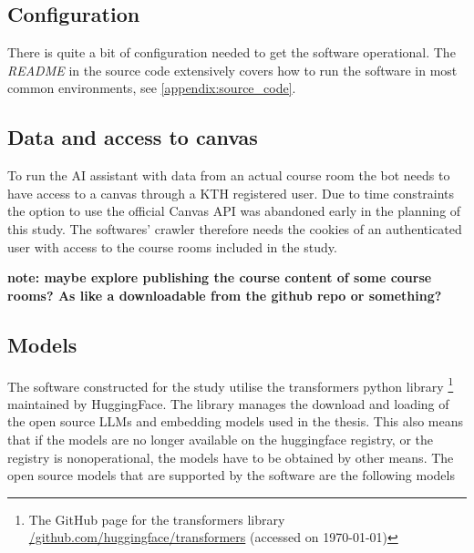 \subsection{Configuration}


There is quite a bit of configuration needed to get the software operational. The \textit{README} in the source code extensively covers how to run the software in most common environments, see \autoref{appendix:source_code}.


\subsection[Data/Access to Canvas]{Data and access to canvas}


To run the AI assistant with data from an actual course room the bot needs to have access to a canvas through a KTH registered user. Due to time constraints the option to use the official Canvas API was abandoned early in the planning of this study. The softwares’ crawler therefore needs the cookies of an authenticated user with access to the course rooms included in the study.


\textbf{note: maybe explore publishing the course content of some course rooms? As like a downloadable from the github repo or something?}


\subsection{Models}


The software constructed for the study utilise the transformers python library \footnote{The GitHub page for the transformers library \href{https://github.com/huggingface/transformers}{/github.com/huggingface/transformers} (accessed on \today)} maintained by HuggingFace. The library manages the download and loading of the open source \gls{LLM}s and embedding models used in the thesis. This also means that if the models are no longer available on the huggingface registry, or the registry is nonoperational, the models have to be obtained by other means. The open source models that are supported by the software are the following models


